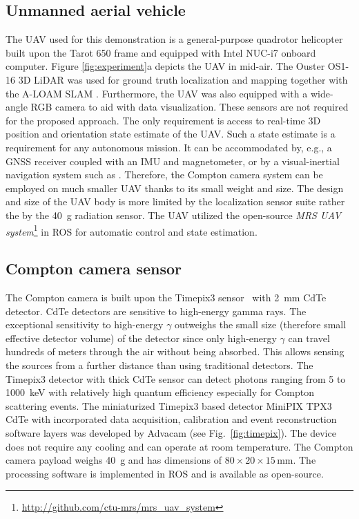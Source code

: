 \documentclass[a4paper,11pt,titlepage,twoside]{book}
\newcommand{\reffig}[1]{Fig.~\ref{#1}}
\begin{document}
\subsection{Unmanned aerial vehicle}

The \ac{UAV} used for this demonstration is a general-purpose quadrotor helicopter built upon the Tarot 650 frame and equipped with Intel NUC-i7 onboard computer.
Figure \ref{fig:experiment}a depicts the \ac{UAV} in mid-air.
The Ouster OS1-16 3D \ac{LiDAR} was used for ground truth localization and mapping together with the A-LOAM \ac{SLAM} \cite{zhang2014loam}.
Furthermore, the \ac{UAV} was also equipped with a wide-angle RGB camera to aid with data visualization.
These sensors are not required for the proposed approach.
The only requirement is access to real-time 3D position and orientation state estimate of the \ac{UAV}.
Such a state estimate is a requirement for any autonomous mission.
It can be accommodated by, e.g., a \ac{GNSS} receiver coupled with an \ac{IMU} and magnetometer, or by a visual-inertial navigation system such as \cite{qin2018vins}.
Therefore, the Compton camera system can be employed on much smaller \ac{UAV} thanks to its small weight and size.
The design and size of the \ac{UAV} body is more limited by the localization sensor suite rather the by the \SI{40}{\gram} radiation sensor.
The \ac{UAV} utilized the open-source \emph{MRS UAV system}\footnote{\url{http://github.com/ctu-mrs/mrs_uav_system}}\cite{baca2020mrs} in \ac{ROS} for automatic control and state estimation.

\subsection{Compton camera sensor}

The Compton camera is built upon the Timepix3 sensor~\cite{poikela2014timepix3} with \SI{2}{\milli\meter} \ac{CdTe} detector.
\ac{CdTe} detectors are sensitive to high-energy gamma rays.
The exceptional sensitivity to high-energy $\gamma$ outweighs the small size (therefore small effective detector volume) of the detector since only high-energy $\gamma$ can travel hundreds of meters through the air without being absorbed.
This allows sensing the sources from a further distance than using traditional detectors.
The Timepix3 detector with thick \ac{CdTe} sensor can detect photons ranging from 5 to \SI{1000}{\kilo\electronvolt} with relatively high quantum efficiency especially for Compton scattering events.
The miniaturized Timepix3 based detector MiniPIX TPX3 \ac{CdTe} with incorporated data acquisition, calibration and event reconstruction software layers was developed by Advacam (see \reffig{fig:timepix}).
The device does not require any cooling and can operate at room temperature.
The Compton camera payload weighs \SI{40}{\gram} and has dimensions of $80 \times 20 \times 15$\,\si{\milli\meter}.
The processing software is implemented in \ac{ROS} and is available as open-source.
\end{document}
